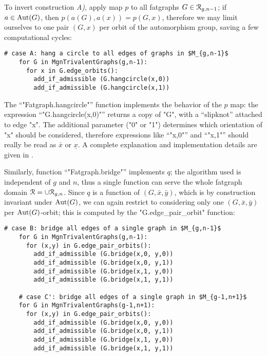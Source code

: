 To invert construction {\slshape A)}, apply map $p$ to all fatgraphs $G \in
\mathcal{R}_{g,n-1}$; if $a \in \operatorname{Aut}(G)$, then $p(a(G), a(x)) = p(G, x)$,
therefore we may limit ourselves to one pair $(G,x)$ per orbit of the
automorphism group, saving a few computational cycles:
\begin{lstlisting}[name=MgnTrivalentGraphs,firstnumber=30]
    # case A: hang a circle to all edges of graphs in $M_{g,n-1}$
    for G in MgnTrivalentGraphs(g,n-1):
      for x in G.edge_orbits():
        add_if_admissible (G.hangcircle(x,0))
        add_if_admissible (G.hangcircle(x,1))

\end{lstlisting}
The ``"Fatgraph.hangcircle"'' function implements the behavior of the
$p$ map: the expression ``"G.hangcircle(x,0)"'' returns a copy of
"G", with a ``slipknot'' attached to edge "x".  The additional
parameter ("0" or "1") determines which orientation of "x"
should be considered, therefore expressions like ``"x,0"'' and
``"x,1"'' should really be read as $\bar{x}$ or $\underline{x}$. A
complete explanation and implementation details are given in
.

Similarly, function ``"Fatgraph.bridge"'' implements $q$;
the algorithm used is independent of $g$ and $n$, thus a single
function can serve the whole fatgraph domain $\mathcal{R} = \cup
\mathcal{R}_{g,n}$. Since $q$ is a function of $(G, \bar{x}, \bar{y})$, which
is by construction invariant under $\operatorname{Aut}(G)$, we can again restrict
to considering only one $(G, \bar{x}, \bar{y})$ per $\operatorname{Aut}(G)$-orbit;
this is computed by the "G.edge_pair_orbit" function:
\begin{lstlisting}[name=MgnTrivalentGraphs,firstnumber=35]
    # case B: bridge all edges of a single graph in $M_{g,n-1}$
    for G in MgnTrivalentGraphs(g,n-1):
      for (x,y) in G.edge_pair_orbits():
        add_if_admissible (G.bridge(x,0, y,0))
        add_if_admissible (G.bridge(x,0, y,1))
        add_if_admissible (G.bridge(x,1, y,0))
        add_if_admissible (G.bridge(x,1, y,1))

    # case C': bridge all edges of a single graph in $M_{g-1,n+1}$
    for G in MgnTrivalentGraphs(g-1,n+1):
      for (x,y) in G.edge_pair_orbits():
        add_if_admissible (G.bridge(x,0, y,0))
        add_if_admissible (G.bridge(x,0, y,1))
        add_if_admissible (G.bridge(x,1, y,0))
        add_if_admissible (G.bridge(x,1, y,1))

\end{lstlisting}

